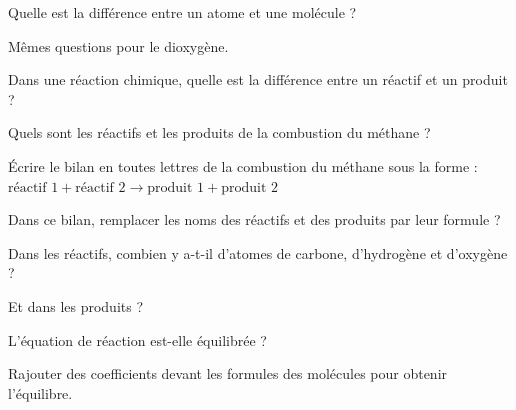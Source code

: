 \documentclass[a4paper,11pt]{exam}
\begin{document}
\begin{questions}
	\question Quelle est la différence entre un atome et une molécule ?
	
	\fillwithdottedlines{1.5cm}
	
	
	\question 
	
	
	\question Mêmes questions pour le dioxygène.
	\fillwithdottedlines{1.5cm}
	
%	
%	
%	
	\question Dans une réaction chimique, quelle est la différence entre un réactif et un produit ?
	
	\fillwithdottedlines{2cm}
	
	\question Quels sont les réactifs et les produits de la combustion du méthane ?
	
	\fillwithdottedlines{1.5cm}
	
	\question \'Ecrire le bilan en toutes lettres de la combustion du méthane sous la forme :\\
	$ \text{r\'eactif 1} + \text{r\'eactif 2} \rightarrow \text{produit 1} + \text{produit 2}$
	
	\fillwithdottedlines{1cm}
	
	\question Dans ce bilan, remplacer les noms des réactifs et des produits par leur formule ?
	
	\fillwithdottedlines{1cm}
	
	\question Dans les réactifs, combien y a-t-il d'atomes de carbone, d'hydrogène et d'oxygène ?
	
	\fillwithdottedlines{1.5cm}
	
	\question Et dans les produits ?
	
	\fillwithdottedlines{1.5cm}
	
	\question L'équation de réaction est-elle équilibrée ?
	
	\fillwithdottedlines{1cm}
	
	\question Rajouter des coefficients devant les formules des molécules pour obtenir l'équilibre.
	
		\fillwithdottedlines{1cm}
	
\end{questions}
\end{document}
